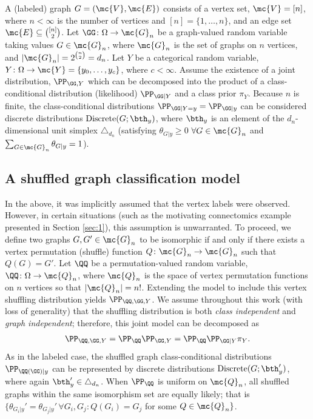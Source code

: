 \documentclass[10pt,journal,cspaper,compsoc]{IEEEtran}
\newcommand{\Qs}{Q}
\begin{document}
A (labeled) graph $G=(\mc{V},\mc{E})$ consists of a vertex set, $\mc{V}=[n]$, where $n < \infty$ is the number of vertices and $[n]=\{1,\ldots, n\}$, and an edge set $\mc{E} \subseteq \binom{[n]}{2}$.
Let $\GG\colon \Omega \to \mc{G}_n$ be a graph-valued random variable taking values $G\in \mc{G}_n$, where $\mc{G}_n$ is the set of graphs on $n$ vertices, and $|\mc{G}_n|=2^{\binom{n}{2}}=d_n$. 
Let $Y$ be a categorical random variable, $Y\colon \Omega \to \mc{Y}=\{y_0,\ldots, y_{c}\}$, where $c< \infty$.  Assume the existence of a joint distribution, $\PP_{\GG,Y}$ which can be decomposed into the product of a class-conditional distribution (likelihood) $\PP_{\GG|Y}$ and a class prior $\pi_Y$. Because $n$ is finite, the class-conditional  distributions $\PP_{\GG | Y=y}=\PP_{\GG|y}$ can be considered discrete distributions $\text{Discrete}(G; \bth_y)$, where $\bth_y$ is an element of the $d_n$-dimensional unit simplex $\triangle_{d_n}$ (satisfying $\theta_{G|y}\geq 0$ $\forall G \in \mc{G}_n$ and $\sum_{G \in \mc{G}_n} \theta_{G|y}=1$).



\subsection{A shuffled graph classification model} %
\label{sub:a_shuffled_graph_classification_model}


In the above, it was implicitly assumed that the vertex labels were observed.  However, in certain situations (such as the motivating connectomics example presented in Section \ref{sec:1}), this assumption is unwarranted.  To proceed, we define two graphs $G,G' \in \mc{G}_n$ to be isomorphic if and only if there exists a vertex permutation (shuffle) function $\Qs\colon\mc{G}_n \to \mc{G}_n$ such that $\Qs(G)=G'$.  Let $\QQ$ be a permutation-valued random variable, $\QQ\colon\Omega \to \mc{Q}_n$, where $\mc{Q}_n$ is the space of vertex permutation functions on $n$ vertices so that $|\mc{Q}_n|=n!$.  Extending the model to include this vertex shuffling distribution yields $\PP_{\QQ,\GG,Y}$.  We assume throughout this work (with loss of generality) that the shuffling distribution is both \emph{class independent} and \emph{graph independent}; therefore, this joint model can be decomposed as
\begin{align}
	\PP_{\QQ,\GG,Y} = \PP_{\QQ} \PP_{\GG,Y} = \PP_{\QQ} \PP_{\GG |Y} \pi_Y.
\end{align}
As in the labeled case, the shuffled graph class-conditional distributions $\PP_{\QQ(\GG)|y}$ can be represented by discrete distributions $\text{Discrete}(G; \bth_y')$, where again $\bth_y' \in \triangle_{d_n}$.  When $\PP_{\QQ}$ is uniform on $\mc{Q}_n$, all shuffled graphs within the same isomorphism set are equally likely; that is  $\{\theta_{G_i|y}' = \theta_{G_j|y}' \, \forall G_i,G_j \colon \Qs(G_i)=G_j$ for some $\Qs \in \mc{Q}_n\}$.
\end{document}
